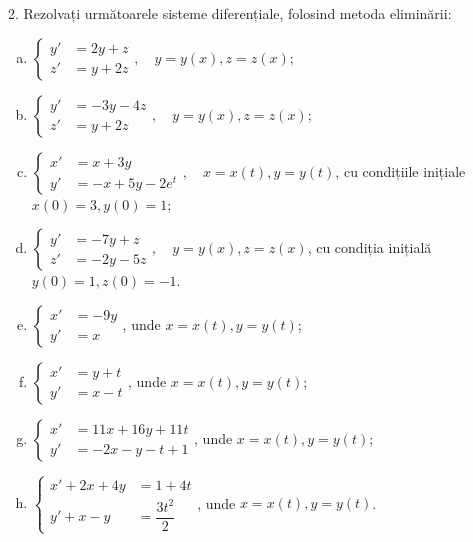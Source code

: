 2. Rezolvați următoarele sisteme diferențiale, folosind metoda eliminării:
\begin{enumerate}[(a)]
\item $ \begin{cases}
    y' &= 2y + z \\
    z' &= y + 2z
  \end{cases}, \quad y = y(x), z = z(x)
  $;
\item $ \begin{cases}
    y' &= -3y - 4z \\
    z' &= y + 2z
  \end{cases}, \quad y = y(x), z = z(x)
  $;
\item $ \begin{cases}
    x' &= x + 3y \\
    y' &= -x + 5y - 2e^t
  \end{cases}, \quad x = x(t), y = y(t) $,
  cu condițiile inițiale $ x(0) = 3, y(0) = 1 $;
\item $ \begin{cases}
    y' &= -7y + z \\
    z' &= -2y - 5z
  \end{cases}, \quad y = y(x), z = z(x) $, cu condiția inițială
  $ y(0) = 1, z(0) = -1 $.
\item $ \begin{cases}
    x' &= -9y \\
    y' &= x
  \end{cases} $, unde $ x = x(t), y = y(t) $;
\item $ \begin{cases}
    x' &= y + t \\
    y' &= x - t 
  \end{cases} $, unde $ x = x(t), y = y(t) $;
\item $ \begin{cases}
    x' &= 11x + 16y + 11t \\
    y' &= -2x - y - t + 1 
  \end{cases} $, unde $ x = x(t), y = y(t) $;
\item $ \begin{cases}
    x' + 2x + 4y &= 1 + 4t \\
    y' + x - y &= \dfrac{3t^2}{2}
  \end{cases} $, unde $ x = x(t), y = y(t) $.
\end{enumerate}


